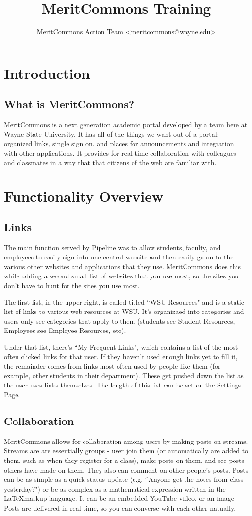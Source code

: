\documentclass[titlepage]{article}
\title{MeritCommons Training}
\author{MeritCommons Action Team <meritcommons@wayne.edu>}
\begin{document}

\tableofcontents
\newpage


\section{Introduction}
\subsection{What is MeritCommons?}
MeritCommons is a next generation academic portal developed by a team here at Wayne State University.  It has all of the things we want out of a portal: organized links, single sign on, and places for announcements and integration with other applications. It provides for real-time collaboration with colleagues and classmates in a way that that citizens of the web are familiar with.


\section{Functionality Overview}
\subsection{Links}
The main function served by Pipeline was to allow students, faculty, and employees to easily sign into one central website and then easily go on to the various other websites and applications that they use. MeritCommons does this while adding a second small list of websites that you use most, so the sites you don't have to hunt for the sites you use most.

The first list, in the upper right, is called titled ``WSU Resources" and is a static list of links to various web resources at WSU. It's organizaed into categories and users only see categories that apply to them (students see Student Resources, Employees see Employee Resources, etc). 

Under that list, there's ``My Frequent Links", which contains a list of the most often clicked links for that user. If they haven't used enough links yet to fill it, the remainder comes from links most often used by people like them (for example, other students in their department). These get pushed down the list as the user uses links themselves. The length of this list can be set on the Settings Page.

\subsection{Collaboration}
MeritCommons allows for collaboration among users by making posts on streams. Streams are are essentially groups - user join them (or automatically are added to them, such as when they register for a class), make posts on them, and see posts others have made on them. They also can comment on other people's posts. Posts can be as simple as a quick status update (e.g. ``Anyone get the notes from class yesterday?") or be as complex as a mathematical expression written in the \LaTeX markup language. It can be an embedded YouTube video, or an image. Posts are delivered in real time, so you can converse with each other natually. 
\end{document}
